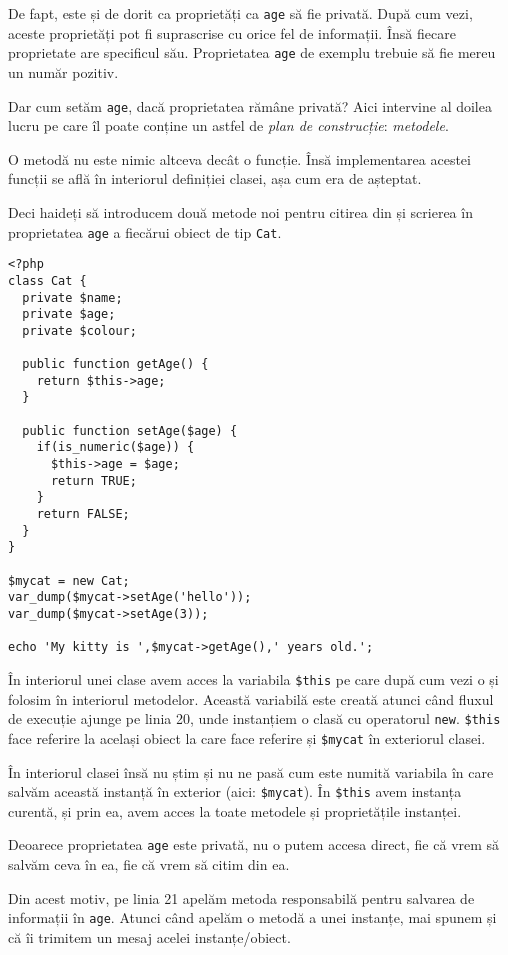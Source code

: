 De fapt, este și de dorit ca proprietăți ca \texttt{age} să fie privată. După cum vezi,
aceste proprietăți pot fi suprascrise cu orice fel de informații. Însă fiecare proprietate
are specificul său. Proprietatea \texttt{age} de exemplu trebuie să fie mereu un număr pozitiv.

Dar cum setăm \texttt{age}, dacă proprietatea rămâne privată? Aici intervine al doilea lucru
pe care îl poate conține un astfel de \textit{plan de construcție}: \textsl{metodele}.

O metodă nu este nimic altceva decât o funcție. Însă implementarea acestei funcții se află
în interiorul definiției clasei, așa cum era de așteptat.

Deci haideți să introducem două metode noi pentru citirea din și scrierea în proprietatea
\texttt{age} a fiecărui obiect de tip \texttt{Cat}.

\begin{lstlisting}[title=Getters and Setters]
<?php
class Cat {
  private $name;
  private $age;
  private $colour;

  public function getAge() {
    return $this->age;
  }

  public function setAge($age) {
    if(is_numeric($age)) {
      $this->age = $age;
      return TRUE;
    }
    return FALSE;
  }
}

$mycat = new Cat;
var_dump($mycat->setAge('hello'));
var_dump($mycat->setAge(3));

echo 'My kitty is ',$mycat->getAge(),' years old.';
\end{lstlisting}

În interiorul unei clase avem acces la variabila \texttt{\$this} pe care
după cum vezi o și folosim în interiorul metodelor. Această variabilă
este creată atunci când fluxul de execuție ajunge pe linia 20, unde instanțiem
o clasă cu operatorul \texttt{new}. \texttt{\$this} face referire la același obiect la care face
referire și \texttt{\$mycat} în exteriorul clasei.

În interiorul clasei însă nu știm și nu ne pasă cum este numită variabila
în care salvăm această instanță în exterior (aici: \texttt{\$mycat}).
În \texttt{\$this} avem instanța curentă,
și prin ea, avem acces la toate metodele și proprietățile instanței.

Deoarece proprietatea \texttt{age} este privată, nu o putem accesa direct,
fie că vrem să salvăm ceva în ea, fie că vrem să citim din ea.

Din acest motiv, pe linia 21 apelăm metoda responsabilă pentru salvarea
de informații în \texttt{age}. Atunci când apelăm o metodă a unei instanțe,
mai spunem și că îi trimitem un mesaj acelei instanțe/obiect.

